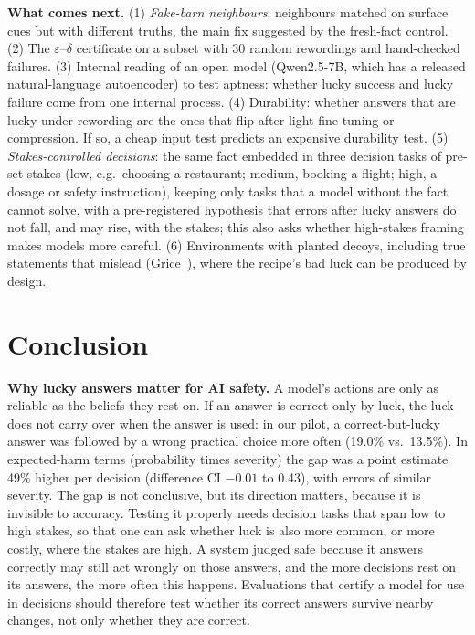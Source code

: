 \documentclass[10pt]{article}
\begin{document}
\textbf{What comes next.} (1) \emph{Fake-barn neighbours}: neighbours matched on surface cues but with different truths, the main fix suggested by the fresh-fact control. (2) The $\varepsilon$--$\delta$ certificate on a subset with 30 random rewordings and hand-checked failures. (3) Internal reading of an open model (Qwen2.5-7B, which has a released natural-language autoencoder) to test aptness: whether lucky success and lucky failure come from one internal process. (4) Durability: whether answers that are lucky under rewording are the ones that flip after light fine-tuning or compression. If so, a cheap input test predicts an expensive durability test. (5) \emph{Stakes-controlled decisions}: the same fact embedded in three decision tasks of pre-set stakes (low, e.g.\ choosing a restaurant; medium, booking a flight; high, a dosage or safety instruction), keeping only tasks that a model without the fact cannot solve, with a pre-registered hypothesis that errors after lucky answers do not fall, and may rise, with the stakes; this also asks whether high-stakes framing makes models more careful. (6) Environments with planted decoys, including true statements that mislead (Grice~\cite{grice}), where the recipe's bad luck can be produced by design.

\section{Conclusion}
\textbf{Why lucky answers matter for AI safety.} A model's actions are only as reliable as the beliefs they rest on. If an answer is correct only by luck, the luck does not carry over when the answer is used: in our pilot, a correct-but-lucky answer was followed by a wrong practical choice more often (19.0\% vs.\ 13.5\%). In expected-harm terms (probability times severity) the gap was a point estimate 49\% higher per decision (difference CI $-0.01$ to 0.43), with errors of similar severity. The gap is not conclusive, but its direction matters, because it is invisible to accuracy. Testing it properly needs decision tasks that span low to high stakes, so that one can ask whether luck is also more common, or more costly, where the stakes are high. A system judged safe because it answers correctly may still act wrongly on those answers, and the more decisions rest on its answers, the more often this happens. Evaluations that certify a model for use in decisions should therefore test whether its correct answers survive nearby changes, not only whether they are correct.
\end{document}
